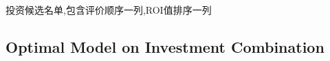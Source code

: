 \documentclass{mcmthesis}
\begin{document}
投资候选名单,包含评价顺序一列,ROI值排序一列




%

\subsection{Optimal Model on Investment Combination}

\end{document}
